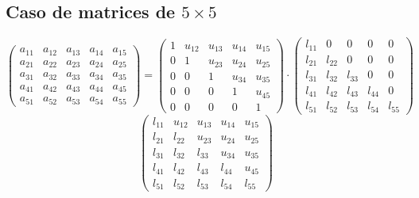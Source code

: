 \documentclass[10pt,a4paper,dvipdfmx]{article}
\begin{document}
\subsection{Caso de matrices de $5\times 5$ }
$$ \left( 
\begin{array}{ccccc}
a_{{1}{1}} & a_{{1}{2}} & a_{{1}{3}} & a_{{1}{4}} & a_{{1}{5}} \\
a_{{2}{1}} & a_{{2}{2}} & a_{{2}{3}} & a_{{2}{4}} & a_{{2}{5}} \\
a_{{3}{1}} & a_{{3}{2}} & a_{{3}{3}} & a_{{3}{4}} & a_{{3}{5}} \\
a_{{4}{1}} & a_{{4}{2}} & a_{{4}{3}} & a_{{4}{4}} & a_{{4}{5}} \\
a_{{5}{1}} & a_{{5}{2}} & a_{{5}{3}} & a_{{5}{4}} & a_{{5}{5}} 
 \end{array}
\right)
 = \left( 
\begin{array}{ccccc}
1 & u_{{1}{2}} & u_{{1}{3}} & u_{{1}{4}} & u_{{1}{5}} \\
0 & 1 & u_{{2}{3}} & u_{{2}{4}} & u_{{2}{5}} \\
0 & 0 & 1 & u_{{3}{4}} & u_{{3}{5}} \\
0 & 0 & 0 & 1 & u_{{4}{5}} \\
0 & 0 & 0 & 0 & 1 
 \end{array}
\right)
 \cdot \left( 
\begin{array}{ccccc}
l_{{1}{1}} & 0 & 0 & 0 & 0 \\
l_{{2}{1}} & l_{{2}{2}} & 0 & 0 & 0 \\
l_{{3}{1}} & l_{{3}{2}} & l_{{3}{3}} & 0 & 0 \\
l_{{4}{1}} & l_{{4}{2}} & l_{{4}{3}} & l_{{4}{4}} & 0 \\
l_{{5}{1}} & l_{{5}{2}} & l_{{5}{3}} & l_{{5}{4}} & l_{{5}{5}} 
 \end{array}
\right)
 $$
$$ \left( 
\begin{array}{ccccc}
l_{{1}{1}} & u_{{1}{2}} & u_{{1}{3}} & u_{{1}{4}} & u_{{1}{5}} \\
l_{{2}{1}} & l_{{2}{2}} & u_{{2}{3}} & u_{{2}{4}} & u_{{2}{5}} \\
l_{{3}{1}} & l_{{3}{2}} & l_{{3}{3}} & u_{{3}{4}} & u_{{3}{5}} \\
l_{{4}{1}} & l_{{4}{2}} & l_{{4}{3}} & l_{{4}{4}} & u_{{4}{5}} \\
l_{{5}{1}} & l_{{5}{2}} & l_{{5}{3}} & l_{{5}{4}} & l_{{5}{5}} 
 \end{array}
\right)
 $$
\end{document}
